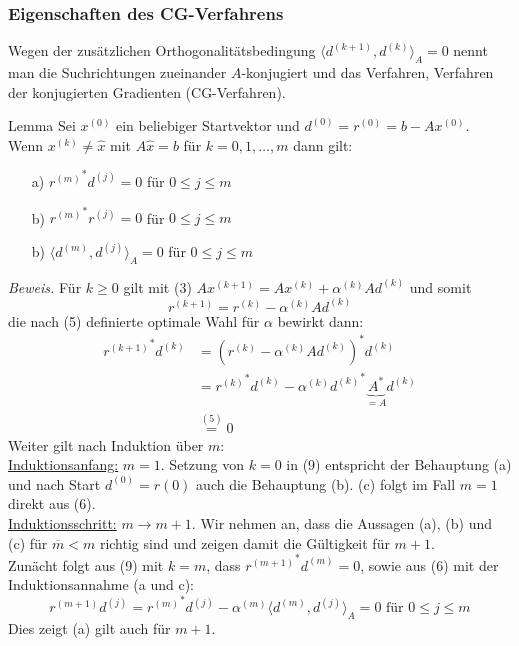 \subsubsection{Eigenschaften des CG-Verfahrens}
Wegen der zusätzlichen Orthogonalitätsbedingung $\langle d^{(k+1)},d^{(k)}\rangle_A=0$ nennt man die 
Suchrichtungen zueinander $A$-konjugiert und das Verfahren, Verfahren der konjugierten Gradienten (CG-Verfahren). 
\begin{thmbox}{Lemma}
    Sei $x^{(0)}$ ein beliebiger Startvektor und $d^{(0)}=r^{(0)}=b-Ax^{(0)}$. \\
    Wenn $x^{(k)}\neq \hat{x}$ mit $A\hat{x}=b$ für $k=0,1,\dotsc, m$ dann gilt:
    \begin{enumerate}
        \item[a)] ${r^{(m)}}^*d^{(j)}=0$ für $0\leq j \le m$
        \item[b)] ${r^{(m)}}^*r^{(j)}=0$ für $0\leq j \le m$ 
        \item[b)] $\langle d^{(m)}, d^{(j)}\rangle_A=0$ für $0\leq j \le m$ 
    \end{enumerate}
\end{thmbox}
\textit{Beweis.} Für $k\geq 0$ gilt mit (3) $Ax^{(k+1)} = Ax^{(k)} + \alpha^{(k)} Ad^{(k)}$ und somit 
\[r^{(k+1)}=r^{(k)}-\alpha^{(k)}Ad^{(k)}\tag{8}\]
die nach (5) definierte optimale Wahl für $\alpha$ bewirkt dann:
\begin{align*}
    {r^{(k+1)}}^*d^{(k)} &= (r^{(k)}-\alpha^{(k)}Ad^{(k)})^* d^{(k)} \\
    &= {r^{(k)}}^* d^{(k)} - \alpha^{(k)}{d^{(k)}}^*\underbrace{A^*}_{=A}d^{(k)} \\
    &\stackrel{(5)}{=} 0 \tag{9}
\end{align*}
Weiter gilt nach Induktion über $m$: \\
\underline{Induktionsanfang:} $m=1$. Setzung von $k=0$ in (9) entspricht der Behauptung (a) 
und nach Start $d^{(0)}=r{(0)}$ auch die Behauptung (b). (c) folgt im Fall $m=1$ direkt aus (6). \\
\underline{Induktionsschritt:} $m\rightarrow m+1$. Wir nehmen an, dass die Aussagen (a), (b) und (c) 
für $\overline{m}<m$ richtig sind und zeigen damit die Gültigkeit für $m+1$. \\
Zunächt folgt aus (9) mit $k=m$, dass ${r^{(m+1)}}^*d^{(m)} = 0$, sowie aus (6) mit der Induktionsannahme (a und c):
\[{r^{(m+1)}}d^{(j)} = {r^{(m)}}^*d^{(j)} - \alpha^{(m)}\langle d^{(m)}, d^{(j)} \rangle_A = 0 
\text{ für } 0\leq j\leq m\]
Dies zeigt (a) gilt auch für $m+1$. \\
